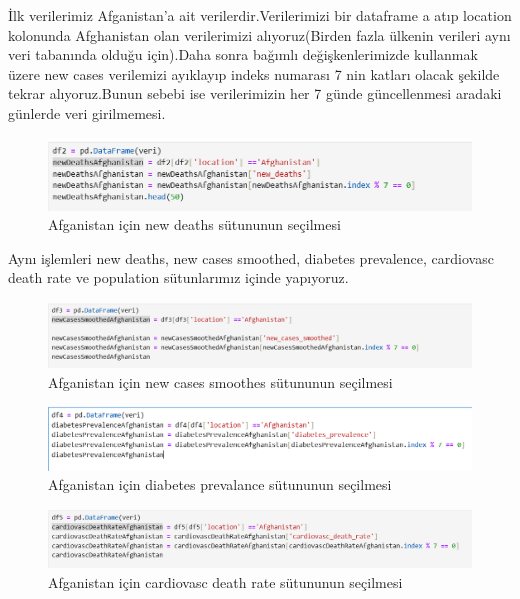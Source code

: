 \documentclass[12pt, a4paper]{article}
\begin{document}
	\newline İlk verilerimiz Afganistan'a ait verilerdir.Verilerimizi bir dataframe a atıp location kolonunda Afghanistan olan verilerimizi alıyoruz(Birden fazla ülkenin verileri aynı veri tabanında olduğu için).Daha sonra bağımlı değişkenlerimizde kullanmak  üzere new cases verilemizi ayıklayıp indeks numarası 7 nin katları olacak şekilde tekrar alıyoruz.Bunun sebebi ise verilerimizin her 7 günde güncellenmesi aradaki günlerde veri girilmemesi.
	\begin{figure}[!htbp] 
		
		\centering
		\includegraphics[angle=0, width=\textwidth]{4.png}
		\caption{Afganistan için new deaths sütununun seçilmesi}
	\end{figure}
	\newline Aynı işlemleri new deaths, new cases smoothed, diabetes prevalence, cardiovasc death rate ve population sütunlarımız içinde yapıyoruz.
	\begin{figure}[!htbp] 
		
		\centering
		\includegraphics[angle=0, width=\textwidth]{5.png}
		\caption{Afganistan için new cases smoothes sütununun seçilmesi}
	\end{figure}
	\begin{figure}[!htbp] 
		
		\centering
		\includegraphics[angle=0, width=\textwidth]{6.png}
		\caption{Afganistan için diabetes prevalance sütununun seçilmesi}
	\end{figure}
	\begin{figure}[!htbp] 
		
		\centering
		\includegraphics[angle=0, width=\textwidth]{7.png}
		\caption{Afganistan için cardiovasc death rate sütununun seçilmesi}
	\end{figure}
\end{document}
